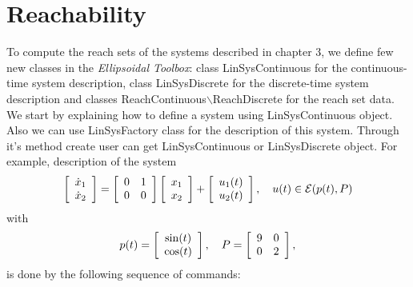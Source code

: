 \documentclass[letterpaper,10pt,english]{sphinxmanual}
\begin{document}
\section{Reachability}
\label{chap_implement:reachability}
To compute the reach sets of the systems described in chapter 3, we
define few new classes in the \emph{Ellipsoidal Toolbox}: class
LinSysContinuous for the continuous-time system description, class
LinSysDiscrete for the discrete-time system description and classes
ReachContinuous$\backslash$ReachDiscrete for the reach set
data. We start by explaining how to define a system using
LinSysContinuous object. Also we can use LinSysFactory class for the
description of this system. Through it’s method create user can get
LinSysContinuous or LinSysDiscrete object. For example, description of
the system
\begin{gather}
\begin{split}\left[\begin{array}{cc}
\dot{x}_1\\
\dot{x}_2\end{array}\right] = \left[\begin{array}{cc}
0 & 1\\
0 & 0\end{array}\right]\left[\begin{array}{c}
x_1\\
x_2\end{array}\right] + \left[\begin{array}{c}
u_1(t)\\
u_2(t)\end{array}\right], ~~~ u(t)\in{\mathcal E}(p(t), P)\end{split}\notag
\end{gather}
with
\begin{gather}
\begin{split}p(t) = \left[\begin{array}{c}
\sin(t)\\
\cos(t)\end{array}\right], ~~~ P = \left[\begin{array}{cc}
9 & 0\\
0 & 2\end{array}\right],\end{split}\notag
\end{gather}
is done by the following sequence of commands:
\end{document}
